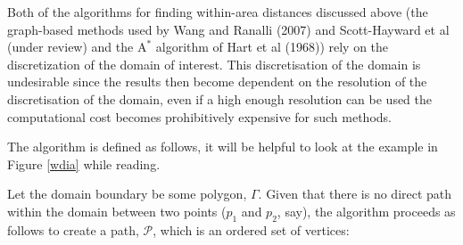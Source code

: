 \documentclass[useAMS, referee]{biom}
\begin{document}
Both of the algorithms for finding within-area distances discussed above (the graph-based methods used by Wang and Ranalli (2007) and Scott-Hayward et al (under review) and the $\text{A}^*$ algorithm of Hart et al (1968)) rely on the discretization of the domain of interest. This discretisation of the domain is undesirable since the results then become dependent on the resolution of the discretisation of the domain, even if a high enough resolution can be used the computational cost becomes prohibitively expensive for such methods.

The algorithm is defined as follows, it will be helpful to look at the example in Figure \ref{wdia} while reading.

Let the domain boundary be some polygon, $\Gamma$. Given that there is no direct path within the domain between two points ($p_1$ and $p_2$, say), the algorithm proceeds as follows to create a path, $\mathcal{P}$, which is an ordered set of vertices:
\end{document}
